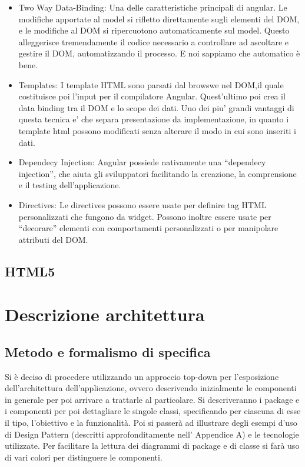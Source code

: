 \begin{itemize}
\item Two Way Data-Binding: Una delle caratteristiche principali di angular. Le modifiche apportate al model si rifletto direttamente sugli elementi del DOM, e le modifiche al DOM si ripercuotono automaticamente sul model. Questo alleggerisce tremendamente il codice necessario a controllare ad ascoltare e gestire il DOM, automatizzando il processo. E noi sappiamo che automatico \`{e} bene.
\item Templates: I template HTML sono parsati dal browswe nel DOM,il quale costituisce poi l’input per il compilatore Angular. Quest’ultimo poi crea il data binding tra il DOM e lo scope dei dati. Uno dei piu’ grandi vantaggi di questa tecnica e’ che separa presentazione da implementazione, in quanto i template html possono modificati senza alterare il modo in cui sono inseriti i dati.
\item Dependecy Injection: Angular possiede nativamente una “dependecy injection”, che aiuta gli sviluppatori facilitando la creazione, la comprensione e il testing dell’applicazione.
\item Directives: Le directives possono essere usate per definire tag HTML personalizzati che fungono da widget. Possono inoltre essere usate per “decorare” elementi con comportamenti personalizzati o per manipolare attributi del DOM. 

\end{itemize}

\subsection{HTML5}

\newpage
\section{Descrizione architettura}
\subsection{Metodo e formalismo di specifica}
Si è deciso di procedere utilizzando un approccio top-down per l’esposizione          dell’architettura dell’applicazione, ovvero descrivendo inizialmente le componenti in generale per poi arrivare a trattarle al particolare.
Si descriveranno i package e i componenti per poi dettagliare le singole classi, specificando per ciascuna di esse il tipo, l’obiettivo e la funzionalità. Poi si passerà ad illustrare degli esempi d’uso di Design Pattern (descritti approfonditamente nell’ Appendice A) e le tecnologie utilizzate.
Per facilitare la lettura dei diagrammi di package e di classe si farà uso di vari colori per distinguere le componenti.

